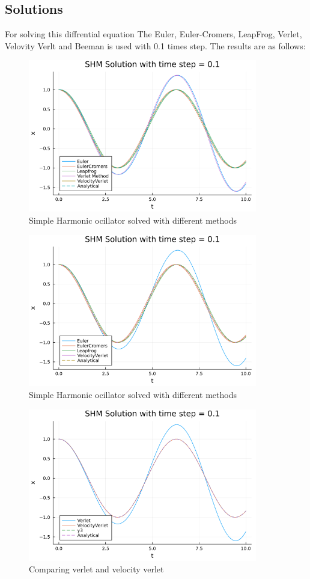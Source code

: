 \documentclass[12pt,a4paper]{article}
\begin{document}
			\subsection*{Solutions}
			For solving this diffrential equation The Euler, Euler-Cromers, LeapFrog, Verlet, Velovity Verlt and Beeman is used with 0.1 times step.
			The results are as follows:
			\begin{figure}[H]
				\centering
				\includegraphics[width=10cm]{all.png}
				\caption{Simple Harmonic ocillator solved with different methods }
			\end{figure}

			\begin{figure}[H]
				\centering
				\includegraphics[width=10cm]{graph.png}
				\caption{Simple Harmonic ocillator solved with different methods }
			\end{figure}
			\begin{figure}[H]
				\centering
				\includegraphics[width=10cm]{verlet.png}
				\caption{Comparing verlet and velocity verlet }
			\end{figure}
			\pagebreak
			
\end{document}
